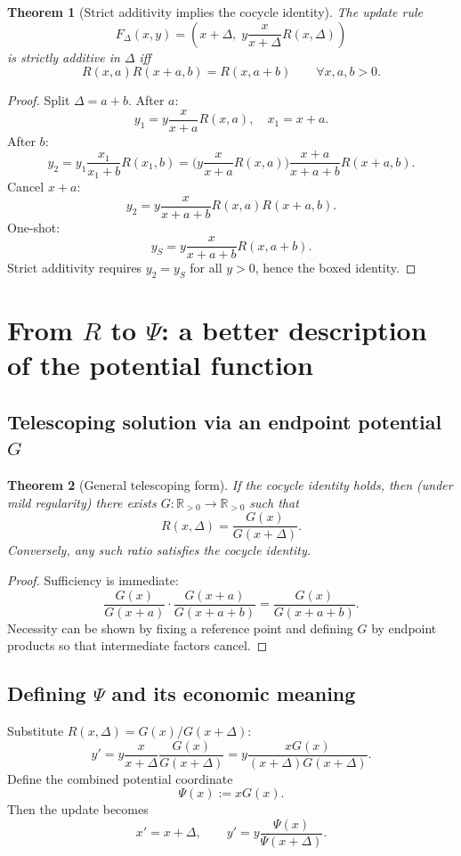 \documentclass[11pt]{article}
\newtheorem{theorem}{Theorem}[section]
\theoremstyle{definition}
\theoremstyle{remark}
\newcommand{\R}{\mathbb{R}}
\newcommand{\Rp}{\R_{>0}}
\begin{document}
\begin{theorem}[Strict additivity implies the cocycle identity]
The update rule
\[
F_\Delta(x,y)=\left(x+\Delta,\; y\frac{x}{x+\Delta}R(x,\Delta)\right)
\]
is strictly additive in $\Delta$ iff
\[
\boxed{R(x,a)R(x+a,b)=R(x,a+b)}\qquad\forall x,a,b>0.
\]
\end{theorem}

\begin{proof}
Split $\Delta=a+b$.
After $a$:
\[
 y_1 = y\frac{x}{x+a}R(x,a),\quad x_1=x+a.
\]
After $b$:
\[
 y_2 = y_1\frac{x_1}{x_1+b}R(x_1,b)
     = \Big(y\frac{x}{x+a}R(x,a)\Big)\frac{x+a}{x+a+b}R(x+a,b).
\]
Cancel $x+a$:
\[
 y_2 = y\frac{x}{x+a+b}R(x,a)R(x+a,b).
\]
One-shot:
\[
 y_S = y\frac{x}{x+a+b}R(x,a+b).
\]
Strict additivity requires $y_2=y_S$ for all $y>0$, hence the boxed identity.
\end{proof}

\section{From $R$ to $\Psi$: a better description of the potential function}

\subsection{Telescoping solution via an endpoint potential $G$}

\begin{theorem}[General telescoping form]
If the cocycle identity holds, then (under mild regularity) there exists $G:\Rp\to\Rp$ such that
\[
\boxed{R(x,\Delta)=\frac{G(x)}{G(x+\Delta)}}.
\]
Conversely, any such ratio satisfies the cocycle identity.
\end{theorem}

\begin{proof}
Sufficiency is immediate:
\[
\frac{G(x)}{G(x+a)}\cdot\frac{G(x+a)}{G(x+a+b)}=\frac{G(x)}{G(x+a+b)}.
\]
Necessity can be shown by fixing a reference point and defining $G$ by endpoint products so that intermediate factors cancel.
\end{proof}

\subsection{Defining $\Psi$ and its economic meaning}

Substitute $R(x,\Delta)=G(x)/G(x+\Delta)$:
\[
 y' = y\frac{x}{x+\Delta}\frac{G(x)}{G(x+\Delta)} = y\frac{xG(x)}{(x+\Delta)G(x+\Delta)}.
\]
Define the combined potential coordinate
\[
\boxed{\Psi(x):=xG(x)}.
\]
Then the update becomes
\begin{equation}
\boxed{\;x'=x+\Delta,\qquad y'=y\frac{\Psi(x)}{\Psi(x+\Delta)}.\;}
\label{eq:psi-exactin}
\end{equation}
\end{document}
